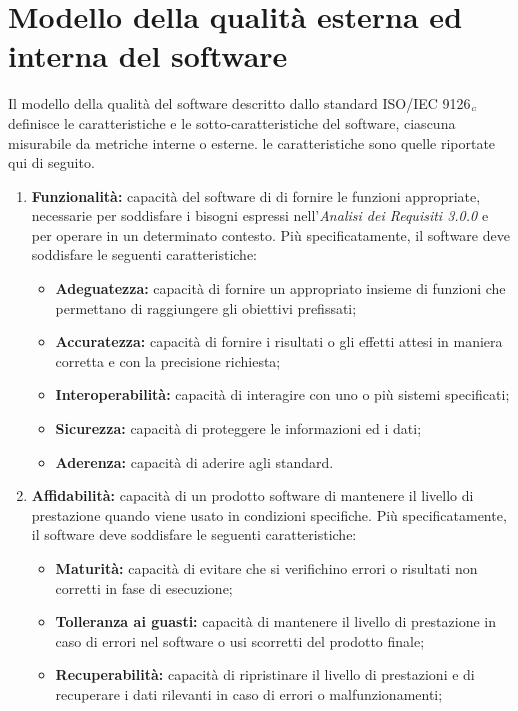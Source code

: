 \section{Modello della qualità esterna ed interna del software}\label{StandardISO/IEC9126ModelloDellaQualitàEsternaEdInternaDelSoftware}
Il modello della qualità del software descritto dallo standard ISO/IEC 9126$_{\scaleto{G}{3pt}}$ definisce le caratteristiche e le sotto-caratteristiche del software, ciascuna misurabile da metriche interne o esterne. le caratteristiche sono quelle riportate qui di seguito.
\begin{enumerate}
	\item \textbf{Funzionalità:} capacità del software di di fornire le funzioni appropriate, necessarie per soddisfare i bisogni espressi nell'\textit{Analisi dei Requisiti 3.0.0} e per operare in un determinato contesto. Più specificatamente, il software deve soddisfare le seguenti caratteristiche:  
 	\begin{itemize}
 		\item \textbf{Adeguatezza:} capacità di fornire un appropriato insieme di funzioni che permettano di raggiungere gli obiettivi prefissati;
 		\item \textbf{Accuratezza:} capacità di fornire i risultati o gli effetti attesi in maniera corretta e con la precisione richiesta;
 		\item \textbf{Interoperabilità:} capacità di interagire con uno o più sistemi specificati;
 		\item \textbf{Sicurezza:} capacità di proteggere le informazioni ed i dati;
 		\item \textbf{Aderenza:} capacità di aderire agli standard.
 	\end{itemize}
 	\item \textbf{Affidabilità:} capacità di un prodotto software di mantenere il livello di prestazione quando viene usato in condizioni specifiche. Più specificatamente, il software deve soddisfare le seguenti caratteristiche: 
 	\begin{itemize}
 		\item \textbf{Maturità:} capacità di evitare che si verifichino errori o risultati non corretti in fase di esecuzione;
 		\item \textbf{Tolleranza ai guasti:} capacità di mantenere il livello di prestazione in caso di errori nel software o usi scorretti del prodotto finale;
 		\item \textbf{Recuperabilità:} capacità di ripristinare il livello di prestazioni e di recuperare i dati rilevanti in caso di errori o malfunzionamenti;

\end{itemize}
\end{enumerate}
